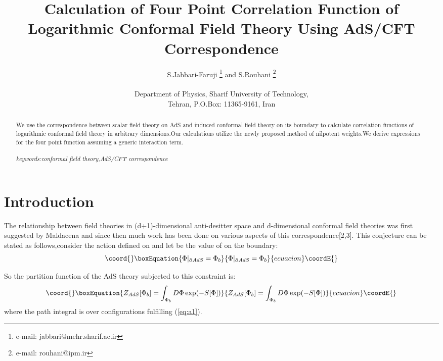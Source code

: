 \documentclass[a4paper,12pt]{article}
\begin{document}
\title{Calculation of Four Point Correlation Function of Logarithmic Conformal Field Theory Using AdS/CFT
Correspondence}
\author{S.Jabbari-Faruji    \footnote{e-mail: jabbari@mehr.sharif.ac.ir}  and
S.Rouhani
\footnote{e-mail: rouhani@ipm.ir}\\
\\
Department of Physics, Sharif University of Technology,\\ Tehran,
P.O.Box: 11365-9161, Iran}
\date{}
\maketitle
\begin{abstract}
 We use the correspondence between scalar field theory on AdS
and induced conformal field theory on its boundary to calculate
correlation functions of logarithmic conformal field theory in
arbitrary dimensions.Our calculations utilize the newly proposed
method of nilpotent weights.We derive expressions for the four
point function assuming a generic interaction term.
\\
\\
{\it keywords:conformal field theory,AdS/CFT  correspondence}
\end{abstract}
\section{Introduction}
            The relationship between field theories in (d+1)-dimensional anti-desitter space and d-dimensional
          conformal field theories was first suggested by Maldacena  and since then much work has been done
          on various aspects of this correspondence[2,3].
            This conjecture can be stated as follows,consider the action \coordHE{} defined on \coordHE{} and let
            \coordHE{}
          be the value of \myHighlight{$\Phi$}\coordHE{} on the boundary:
          \begin{equation}\coord{}\boxEquation{\label{eq:a1}
                                \Phi|_{\partial AdS}=\Phi_{b}
                                }{\Phi|_{\partial AdS}=\Phi_{b}
                                }{ecuacion}\coordE{}\end{equation}

         So the partition function of the AdS theory subjected to this constraint is:
\begin{equation}\coord{}\boxEquation{
         Z_{AdS}[\Phi_{b}]=\int_{\Phi_{b}}
         D\Phi\exp(-S[\Phi])}{
         Z_{AdS}[\Phi_{b}]=\int_{\Phi_{b}}
         D\Phi\exp(-S[\Phi])}{ecuacion}\coordE{}\end{equation}
          where the path integral is over configurations fulfilling
         (\ref{eq:a1}).
\end{document}
